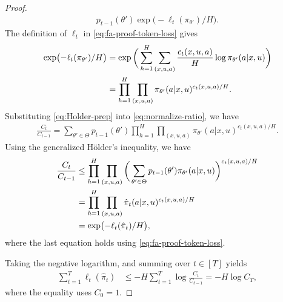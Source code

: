 \documentclass[11pt]{article}
\begin{document}
\begin{proof}
\begin{align}
    p_{t-1}(\theta')
    \exp\bigl(-\ell_t(\pi_{\theta'})/H\bigr).
\end{align}
The definition of $\ell_t$ in \eqref{eq:fa-proof-token-loss} gives
\begin{align}
\notag
    \exp\bigl(-\ell_t(\pi_{\theta'})/H\bigr)
    &=
    \exp\bigg(
        \sum_{h=1}^H\sum_{(x,u,a)}
        \frac{c_t(x,u,a)}H
        \log\pi_{\theta'}(a|x,u)
    \bigg)\\\label{eq:Holder-prep}
    &=
    \prod_{h=1}^H\prod_{(x,u,a)}
    \pi_{\theta'}(a|x,u)^{c_t(x,u,a)/H}.
\end{align}
Substituting \eqref{eq:Holder-prep} into \eqref{eq:normalize-ratio}, we have
\begin{align}
    \frac{C_t}{C_{t-1}}
    =
    \sum_{\theta'\in\Theta}
    p_{t-1}(\theta')
    \prod_{h=1}^H\prod_{(x,u,a)}
    \pi_{\theta'}(a|x,u)^{c_t(x,u,a)/H}.
    \label{eq:fa-proof-potential-ratio}
\end{align}
Using the generalized
H\"older's inequality, we have
\begin{align}
    \frac{C_t}{C_{t-1}}
    &\leq
    \prod_{h=1}^H\prod_{(x,u,a)}
    \bigg(
        \sum_{\theta'\in\Theta}
        p_{t-1}(\theta')\pi_{\theta'}(a|x,u)
    \bigg)^{c_t(x,u,a)/H}
    \notag\\
    &=
    \prod_{h=1}^H\prod_{(x,u,a)}
    \hat\pi_t(a|x,u)^{c_t(x,u,a)/H}
    \notag\\
    &=
    \exp\bigl(-\ell_t(\hat\pi_t)/H\bigr),
    \notag
\end{align}
where the last equation holds using \eqref{eq:fa-proof-token-loss}.

Taking the negative logarithm, and summing over $t \in [T]$ yields
\begin{align}
    \sum_{t=1}^T\ell_t(\hat\pi_t)
    &\leq
    -H\sum_{t=1}^T\log\frac{C_t}{C_{t-1}}
    =
    -H\log C_T,
    \label{eq:fa-proof-telescope}
\end{align}
where the equality uses $C_0=1$.


\end{proof}
\end{document}
